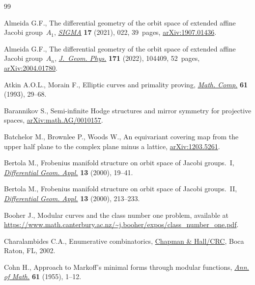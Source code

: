 \documentclass[pdftex]{sigma}
\numberwithin{equation}{section}
\begin{document}
\begin{thebibliography}{99}
\footnotesize\itemsep=-0.5pt

Almeida G.F., The differential geometry of the orbit space of extended affine
 {J}acobi group~{$A_1$},
 \href{https://doi.org/10.3842/SIGMA.2021.022}{\textit{SIGMA}} \textbf{17}
 (2021), 022, 39~pages,
 \href{http://arxiv.org/abs/1907.01436}{arXiv:1907.01436}.

Almeida G.F., The differential geometry of the orbit space of extended affine
 {J}acobi group~{$A_ n$},
 \href{https://doi.org/10.1016/j.geomphys.2021.104409}{\textit{J.~Geom.
 Phys.}} \textbf{171} (2022), 104409, 52~pages,
 \href{http://arxiv.org/abs/2004.01780}{arXiv:2004.01780}.

Atkin A.O.L., Morain F., Elliptic curves and primality proving,
 \href{https://doi.org/10.2307/2152935}{\textit{Math. Comp.}} \textbf{61}
 (1993), 29--68.

Barannikov S., Semi-infinite Hodge structures and mirror symmetry for
 projective spaces,
 \href{http://arxiv.org/abs/math.AG/0010157}{arXiv:math.AG/0010157}.

Batchelor M., Brownlee P., Woods W., An equivariant covering map from the upper
 half plane to the complex plane minus a lattice,
 \href{http://arxiv.org/abs/1203.5261}{arXiv:1203.5261}.

Bertola M., Frobenius manifold structure on orbit space of {J}acobi
 groups.~{I},
 \href{https://doi.org/10.1016/S0926-2245(00)00026-7}{\textit{Differential
 Geom. Appl.}} \textbf{13} (2000), 19--41.

Bertola M., Frobenius manifold structure on orbit space of {J}acobi
 groups.~{II},
 \href{https://doi.org/10.1016/S0926-2245(00)00027-9}{\textit{Differential
 Geom. Appl.}} \textbf{13} (2000), 213--233.

Booher J., Modular curves and the class number one problem, {a}vailable at
 \url{https://www.math.canterbury.ac.nz/~j.booher/expos/class_number_one.pdf}.

Charalambides C.A., Enumerative combinatorics,
 \href{https://doi.org/10.1201/9781315273112}{Chapman \& Hall/CRC}, Boca Raton,
 FL, 2002.

Cohn H., Approach to {M}arkoff's minimal forms through modular functions,
 \href{https://doi.org/10.2307/1969618}{\textit{Ann. of Math.}} \textbf{61}
 (1955), 1--12.


\end{thebibliography}
\end{document}
